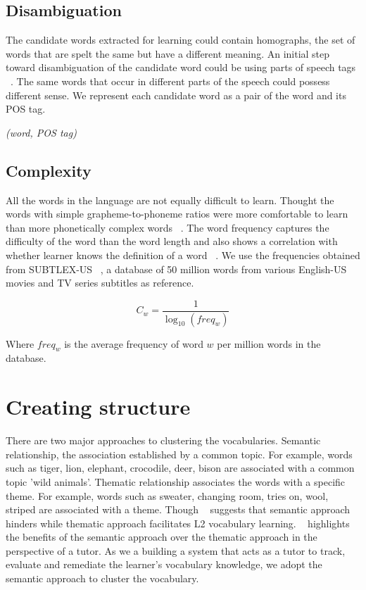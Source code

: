 \documentclass[11pt,a4paper]{article}
\begin{document}
\subsection{Disambiguation}
The candidate words extracted for learning could contain homographs, the set of words that are spelt the same but have a different meaning. An initial step toward disambiguation of the candidate word could be using parts of speech tags ~\cite{wilks1998grammar}. The same words that occur in different parts of the speech could possess different sense. We represent each candidate word as a pair of the word and its POS tag.

\begin{center}\emph{(word, POS tag)}\end{center}

\subsection{Complexity}
All the words in the language are not equally difficult to learn. 
Thought the words with simple grapheme-to-phoneme ratios
were more comfortable to learn than more phonetically complex words ~\cite{rosa2011effect}. The word frequency captures the difficulty of the word than the word length and also shows a correlation with whether learner knows the definition of a word ~\cite{leroy2013effect}. We use the frequencies obtained from SUBTLEX-US ~\cite{brysbaert2009moving}, a database of 50 million words from various English-US movies and TV series subtitles as reference.

\begin{equation}
  C_w = \frac{1}{\log_{10}(freq_w)}
\end{equation}

Where ${freq_w}$ is the average frequency of word $w$ per million words in the database.

\section{Creating structure}
There are two major approaches to clustering the vocabularies. Semantic relationship, the association established by a common topic. For example, words such as tiger, lion, elephant, crocodile, deer, bison are associated with a common topic 'wild animals'. Thematic relationship associates the words with a specific theme. For example, words such as sweater, changing room, tries on, wool, striped are associated with a theme. Though ~\cite{tinkham1997effects} suggests that semantic approach hinders while thematic approach facilitates L2 vocabulary learning. ~\cite{gholami2014semantic} highlights the benefits of the semantic approach over the thematic approach in the perspective of a tutor. As we a building a system that acts as a tutor to track, evaluate and remediate the learner's vocabulary knowledge, we adopt the semantic approach to cluster the vocabulary.
\end{document}
